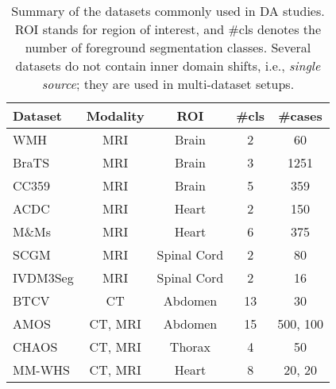 

\begin{table}[ht]
	\centering
	\caption{Summary of the datasets commonly used in DA studies. ROI stands for region of interest, and \#cls denotes the number of foreground segmentation classes. Several datasets do not contain inner domain shifts, i.e., \textit{single source}; they are used in multi-dataset setups.}
	
		\begin{tabular}{@{}lcccc@{}}
			\toprule
			\textbf{Dataset} & \textbf{Modality} & \textbf{ROI} & \textbf{\#cls} & \textbf{\#cases} \\
			\midrule
			WMH \cite{wmh} & MRI & Brain & 2 & 60 \\
			BraTS \cite{brats} & MRI & Brain & 3 & 1251 \\
			CC359 \cite{cc359} & MRI & Brain & 5 & 359 \\
			ACDC \cite{bernard2018deep} & MRI & Heart & 2 & 150 \\
			M\&Ms \cite{campello2021multi} & MRI & Heart & 6 & 375 \\
			SCGM \cite{prados2017spinal} & MRI & Spinal Cord & 2 & 80 \\
			IVDM3Seg \cite{IVDM3Seg2018} & MRI & Spinal Cord & 2 & 16 \\
			BTCV \cite{btcv} & CT & Abdomen & 13 & 30 \\
			AMOS \cite{amos} & CT, MRI & Abdomen & 15 & 500, 100 \\
			CHAOS \cite{kavur2021chaos} & CT, MRI & Thorax & 4 & 50 \\
			MM-WHS \cite{zhuang2016multi} & CT, MRI & Heart & 8 & 20, 20 \\
			\bottomrule
	\end{tabular}%
	\label{tab:datasets}
\end{table}
